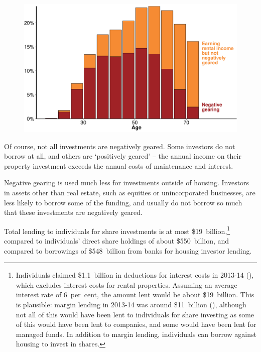\documentclass{grattanAlpha}\usepackage[]{graphicx}\usepackage[]{color}
\begin{document}
\begin{figure}

\includegraphics[width=1.22\columnwidth]{./CGT-NG-atlas/NG-PG-by-age-protrude.pdf}

\end{figure}

Of course, not all investments are negatively geared. Some investors do not borrow at all, and others are ‘positively geared’ – the annual income on their property investment exceeds the annual costs of maintenance and interest. 
  
  Negative gearing is used much less for investments outside of housing. Investors in assets other than real estate, such as equities or unincorporated businesses, are less likely to borrow some of the funding, and usually do not borrow so much that these investments are negatively geared. 

Total lending to individuals for share investments is at most \$19~billion,\footnote{Individuals claimed \$1.1~billion in deductions for interest costs in 2013-14 (\textcite[][Table 12]{ATOTaxstats201314}), which excludes interest costs for rental properties. Assuming an average interest rate of 6~per~cent, the amount lent would be about \$19~billion. This is plausible: margin lending in 2013-14 was around \$11~billion (\textcite{RBA2015StatsMarginLending}), although not all of this would have been lent to individuals for share investing as some of this would have been lent to companies, and some would have been lent for managed funds. In addition to margin lending, individuals can borrow against housing to invest in shares.}  compared to individuals’ direct share holdings of about \$550~billion,  and compared to borrowings of \$548~billion from banks for housing investor lending.  
\end{document}
